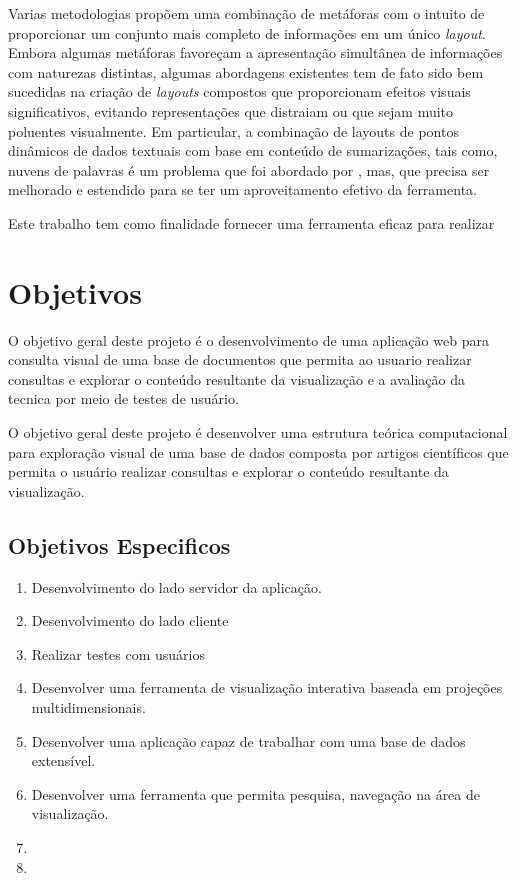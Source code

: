 Varias metodologias propõem uma combinação de metáforas com o intuito de proporcionar um conjunto mais completo de informações em um único \emph{layout}.
 Embora algumas metáforas favoreçam a apresentação simultânea de informações com naturezas distintas, algumas abordagens existentes tem de fato sido bem sucedidas na criação de \emph{layouts} compostos que proporcionam efeitos visuais significativos, evitando representações que distraiam ou que sejam muito poluentes visualmente\cite{pagliosa2013mist}. Em particular, a combinação de layouts de pontos dinâmicos de dados textuais com base em conteúdo de sumarizações, tais como, nuvens de palavras é um problema que foi abordado por \cite{pagliosa2013mist}, mas, que precisa ser melhorado e estendido para se ter um aproveitamento efetivo da ferramenta.

 Este trabalho tem como finalidade fornecer uma ferramenta eficaz para realizar 

\section{Objetivos}
\label{Objetivos}

O objetivo geral deste projeto é o desenvolvimento de uma aplicação web para consulta visual de uma base de documentos que permita ao usuario realizar consultas e explorar o conteúdo resultante da visualização e a avaliação da tecnica por meio de testes de usuário.


O objetivo geral deste projeto é desenvolver uma estrutura teórica
computacional para exploração visual de uma base de dados composta por artigos científicos que permita o usuário realizar consultas e explorar o conteúdo resultante da visualização.

\subsection{Objetivos Especificos}
\label{ObjetivosEspecificos}

\begin{enumerate} %
	\item Desenvolvimento do lado servidor da aplicação.
    \item Desenvolvimento do lado cliente
    \item Realizar testes com usuários 

\item Desenvolver uma ferramenta de visualização interativa baseada em projeções multidimensionais.
	\item Desenvolver uma aplicação capaz de trabalhar com uma base de dados extensível. 
	\item Desenvolver uma ferramenta que permita pesquisa, navegação na área de visualização.
	\item 
	\item 
		
	
\end{enumerate} %
  
